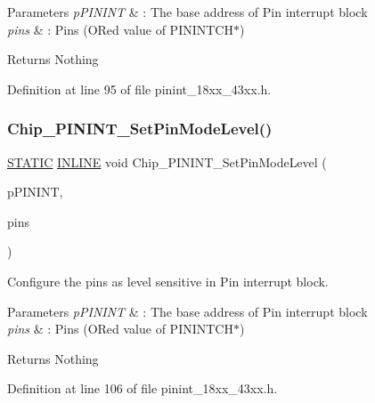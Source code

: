 \begin{DoxyParams}{Parameters}
{\em p\+P\+I\+N\+I\+NT} & \+: The base address of Pin interrupt block \\
\hline
{\em pins} & \+: Pins (O\+Red value of P\+I\+N\+I\+N\+T\+C\+H$\ast$) \\
\hline
\end{DoxyParams}
\begin{DoxyReturn}{Returns}
Nothing 
\end{DoxyReturn}


Definition at line 95 of file pinint\+\_\+18xx\+\_\+43xx.\+h.

\mbox{\label{group___p_i_n_i_n_t__18_x_x__43_x_x_ga4a9efb559231903508b66858a43b552d}} 
\subsubsection{\texorpdfstring{Chip\+\_\+\+P\+I\+N\+I\+N\+T\+\_\+\+Set\+Pin\+Mode\+Level()}{Chip\_PININT\_SetPinModeLevel()}}
{\footnotesize\ttfamily \hyperlink{group___l_p_c___types___public___macros_ga10b2d890d871e1489bb02b7e70d9bdfb}{S\+T\+A\+T\+IC} \hyperlink{spifi__18xx__43xx_8h_a2eb6f9e0395b47b8d5e3eeae4fe0c116}{I\+N\+L\+I\+NE} void Chip\+\_\+\+P\+I\+N\+I\+N\+T\+\_\+\+Set\+Pin\+Mode\+Level (\begin{DoxyParamCaption}\item[{\hyperlink{struct_l_p_c___p_i_n___i_n_t___t}{L\+P\+C\+\_\+\+P\+I\+N\+\_\+\+I\+N\+T\+\_\+T} $\ast$}]{p\+P\+I\+N\+I\+NT,  }\item[{uint32\+\_\+t}]{pins }\end{DoxyParamCaption})}



Configure the pins as level sensitive in Pin interrupt block. 


\begin{DoxyParams}{Parameters}
{\em p\+P\+I\+N\+I\+NT} & \+: The base address of Pin interrupt block \\
\hline
{\em pins} & \+: Pins (O\+Red value of P\+I\+N\+I\+N\+T\+C\+H$\ast$) \\
\hline
\end{DoxyParams}
\begin{DoxyReturn}{Returns}
Nothing 
\end{DoxyReturn}


Definition at line 106 of file pinint\+\_\+18xx\+\_\+43xx.\+h.


